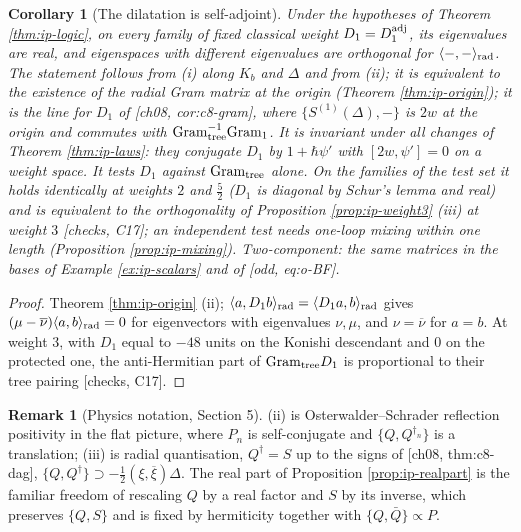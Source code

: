 \documentclass[11pt]{report}
\theoremstyle{plain}
\newtheorem{corollary}[theorem]{Corollary}
\theoremstyle{definition}
\newtheorem{remark}[theorem]{Remark}
\numberwithin{equation}{chapter}
\newcommand{\Gt}{\mathrm{Gram}_{\rm tree}}
\newcommand{\Go}{\mathrm{Gram}_{1}}
\newcommand{\rad}{{\rm rad}}
\begin{document}
\begin{corollary}[The dilatation is self-adjoint]
\label{cor:ip-D}
Under the hypotheses of Theorem \ref{thm:ip-logic}, on every family of fixed classical weight $D_1=D_1^{\rm adj}$, its eigenvalues are real, and eigenspaces with different eigenvalues are orthogonal for $\langle-,-\rangle_\rad$. The statement follows from (i) along $K_b$ and $\Delta$ and from (ii); it is equivalent to the existence of the radial Gram matrix at the origin (Theorem \ref{thm:ip-origin}); it is the line for $D_1$ of [ch08, cor:c8-gram], where $\{S^{(1)}(\Delta),-\}$ is $2w$ at the origin and commutes with $\Gt^{-1}\Go$. It is invariant under all changes of Theorem \ref{thm:ip-laws}: they conjugate $D_1$ by $1+\hbar\psi'$ with $[2w,\psi']=0$ on a weight space. It tests $D_1$ against $\Gt$ alone. On the families of the test set it holds identically at weights $2$ and $\tfrac52$ ($D_1$ is diagonal by Schur's lemma and real) and is equivalent to the orthogonality of Proposition \ref{prop:ip-weight3} (iii) at weight $3$ [checks, C17]; an independent test needs one-loop mixing within one length (Proposition \ref{prop:ip-mixing}). Two-component: the same matrices in the bases of Example \ref{ex:ip-scalars} and of [odd, eq:o-BF].
\end{corollary}

\begin{proof}
Theorem \ref{thm:ip-origin} (ii); $\langle a,D_1b\rangle_\rad=\langle D_1a,b\rangle_\rad$ gives $(\mu-\overline\nu)\langle a,b\rangle_\rad=0$ for eigenvectors with eigenvalues $\nu,\mu$, and $\nu=\overline\nu$ for $a=b$. At weight $3$, with $D_1$ equal to $-48$ units on the Konishi descendant and $0$ on the protected one, the anti-Hermitian part of $\Gt D_1$ is proportional to their tree pairing [checks, C17].
\end{proof}

\begin{remark}[Physics notation, Section 5]
(ii) is Osterwalder--Schrader reflection positivity in the flat picture, where $P_n$ is self-conjugate and $\{Q,Q^{\dagger_n}\}$ is a translation; (iii) is radial quantisation, $Q^\dagger=S$ up to the signs of [ch08, thm:c8-dag], $\{Q,Q^\dagger\}\supset-\tfrac12(\xi,\overline\xi)\Delta$. The real part of Proposition \ref{prop:ip-realpart} is the familiar freedom of rescaling $Q$ by a real factor and $S$ by its inverse, which preserves $\{Q,S\}$ and is fixed by hermiticity together with $\{Q,\bar Q\}\propto P$.
\end{remark}
\end{document}
